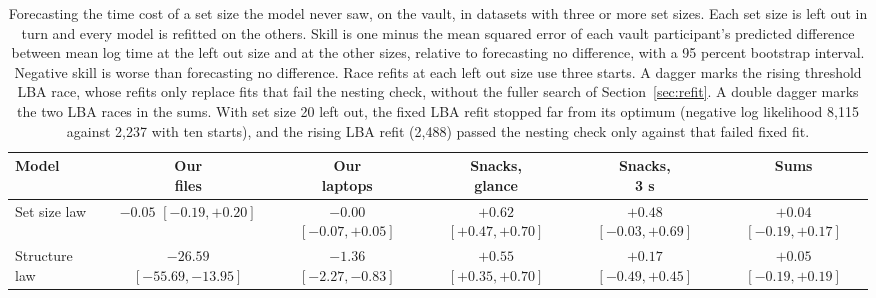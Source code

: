 \begin{table}[t]
\centering
\footnotesize
\setlength{\tabcolsep}{4pt}
\caption{Forecasting the time cost of a set size the model never saw, on the vault, in datasets with three or more set sizes. Each set size is left out in turn and every model is refitted on the others. Skill is one minus the mean squared error of each vault participant's predicted difference between mean log time at the left out size and at the other sizes, relative to forecasting no difference, with a 95 percent bootstrap interval. Negative skill is worse than forecasting no difference. Race refits at each left out size use three starts. A dagger marks the rising threshold LBA race, whose refits only replace fits that fail the nesting check, without the fuller search of Section~\ref{sec:refit}. A double dagger marks the two LBA races in the sums. With set size 20 left out, the fixed LBA refit stopped far from its optimum (negative log likelihood 8{,}115 against 2{,}237 with ten starts), and the rising LBA refit (2{,}488) passed the nesting check only against that failed fixed fit.}
\label{tab:unseen}
\begin{tabular}{>{\raggedright\arraybackslash}p{4.4cm}ccccc}
\toprule
Model & \makecell{Our\\files} & \makecell{Our\\laptops} & \makecell{Snacks,\\glance} & \makecell{Snacks,\\3 s} & Sums \\
\midrule
Set size law & \makecell{$-0.05$ \\ {\scriptsize $[-0.19, +0.20]$}} & \makecell{$-0.00$ \\ {\scriptsize $[-0.07, +0.05]$}} & \makecell{$+0.62$ \\ {\scriptsize $[+0.47, +0.70]$}} & \makecell{$+0.48$ \\ {\scriptsize $[-0.03, +0.69]$}} & \makecell{$+0.04$ \\ {\scriptsize $[-0.19, +0.17]$}} \\
Structure law & \makecell{$-26.59$ \\ {\scriptsize $[-55.69, -13.95]$}} & \makecell{$-1.36$ \\ {\scriptsize $[-2.27, -0.83]$}} & \makecell{$+0.55$ \\ {\scriptsize $[+0.35, +0.70]$}} & \makecell{$+0.17$ \\ {\scriptsize $[-0.49, +0.45]$}} & \makecell{$+0.05$ \\ {\scriptsize $[-0.19, +0.19]$}} \\

\end{tabular}
\end{table}
